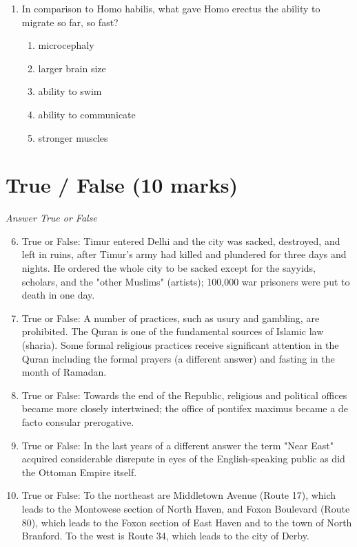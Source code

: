 \documentclass[12pt]{article}
\begin{document}
\begin{enumerate}[label=\arabic*.]
\begin{enumerate}[label=(\alph*)]
    \item When sled dogs were first domesticated
    \item When eastern Siberia was first inhabited
    \item When the Bering Strait was exposed and open for travel
    \item The timeline of the Ice Age
\end{enumerate}
\item In comparison to Homo habilis, what gave Homo erectus the ability to migrate so far, so fast?
\begin{enumerate}[label=(\alph*)]
    \item microcephaly
    \item larger brain size
    \item ability to swim
    \item ability to communicate
    \item stronger muscles
\end{enumerate}
\end{enumerate}

\section*{True / False (10 marks)}
\textit{Answer True or False}
\begin{enumerate}[label=\arabic*.]
\setcounter{enumi}{5}
\item True or False: Timur entered Delhi and the city was sacked, destroyed, and left in ruins, after Timur's army had killed and plundered for three days and nights. He ordered the whole city to be sacked except for the sayyids, scholars, and the "other Muslims" (artists); 100,000 war prisoners were put to death in one day.
\item True or False: A number of practices, such as usury and gambling, are prohibited. The Quran is one of the fundamental sources of Islamic law (sharia). Some formal religious practices receive significant attention in the Quran including the formal prayers (a different answer) and fasting in the month of Ramadan.
\item True or False: Towards the end of the Republic, religious and political offices became more closely intertwined; the office of pontifex maximus became a de facto consular prerogative.
\item True or False: In the last years of a different answer the term "Near East" acquired considerable disrepute in eyes of the English-speaking public as did the Ottoman Empire itself.
\item True or False: To the northeast are Middletown Avenue (Route 17), which leads to the Montowese section of North Haven, and Foxon Boulevard (Route 80), which leads to the Foxon section of East Haven and to the town of North Branford. To the west is Route 34, which leads to the city of Derby.
\end{enumerate}
\end{document}
